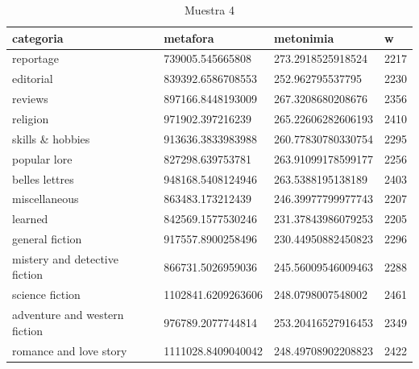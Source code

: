 \documentclass[twoside]{article}
\begin{document}
\begin{center}
\begin{longtable}{| p{} | p{} | p{}|p{}|}
\caption{Muestra 4}
    \hline
        categoria & metafora & metonimia & w \\ \hline
        reportage & 739005.545665808 & 273.2918525918524 & 2217 \\ \hline
        editorial & 839392.6586708553 & 252.962795537795 & 2230 \\ \hline
        reviews & 897166.8448193009 & 267.3208680208676 & 2356 \\ \hline
        religion & 971902.397216239 & 265.22606282606193 & 2410 \\ \hline
        skills \& hobbies & 913636.3833983988 & 260.77830780330754 & 2295 \\ \hline
        popular lore & 827298.639753781 & 263.91099178599177 & 2256 \\ \hline
        belles lettres & 948168.5408124946 & 263.5388195138189 & 2403 \\ \hline
        miscellaneous & 863483.173212439 & 246.39977799977743 & 2207 \\ \hline
        learned & 842569.1577530246 & 231.37843986079253 & 2205 \\ \hline
        general fiction & 917557.8900258496 & 230.44950882450823 & 2296 \\ \hline
        mistery and detective fiction & 866731.5026959036 & 245.56009546009463 & 2288 \\ \hline
        science fiction & 1102841.6209263606 & 248.0798007548002 & 2461 \\ \hline
        adventure and western fiction & 976789.2077744814 & 253.20416527916453 & 2349 \\ \hline
        romance and love story & 1111028.8409040042 & 248.49708902208823 & 2422 \\ \hline


\end{longtable}
    \label{muestra4}
\end{center}
\end{document}
